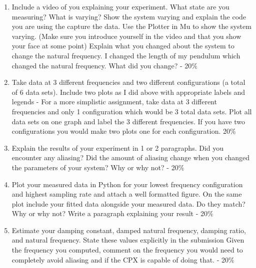 \begin{enumerate}[itemsep=-5pt]
\item Include a video of you explaining your experiment. What state are you measuring? What is varying? Show the system varying and explain the code you are using the capture the data. Use the Plotter in Mu to show the system varying. (Make sure you introduce yourself in the video and that you show your face at some point) Explain what you changed about the system to change the natural frequency. I changed the length of my pendulum which changed the natural frequency. What did you change? - 20\%
\item Take data at 3 different frequencies and two different configurations (a total of 6 data sets). Include two plots as I did above with appropriate labels and legends - For a more simplistic assignment, take data at 3 different frequencies and only 1 configuration which would be 3 total data sets. Plot all data sets on one graph and label the 3 different frequencies. If you have two configurations you would make two plots one for each configuration. 20\%
\item Explain the results of your experiment in 1 or 2 paragraphs. Did you encounter any aliasing? Did the amount of aliasing change when you changed the parameters of your system? Why or why not? - 20\%
\item Plot your measured data in Python for your lowest frequency configuration and highest sampling rate and attach a well formatted figure. On the same plot include your fitted data alongside your measured data. Do they match? Why or why not? Write a paragraph explaining your result - 20\%
\item Estimate your damping constant, damped natural frequency, damping ratio, and natural frequency. State these values explicitly in the submission Given the frequency you computed, comment on the frequency you would need to completely avoid aliasing and if the CPX is capable of doing that. - 20\%
\end{enumerate}
